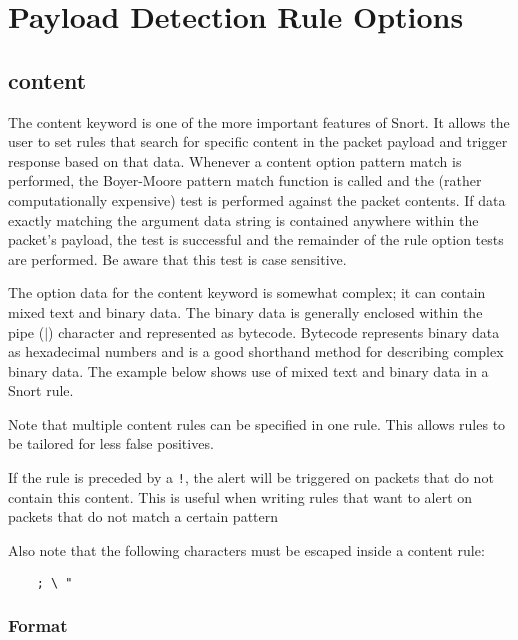 \documentclass[english]{report}
\newenvironment{note}{
\samepage
    \vspace{10pt}{\textsf{
        {\hspace{7pt}\Huge{$\triangle$\hspace{-12.5pt}{\Large{$^!$}}}}\hspace{5pt}
        {\Large{NOTE}}
    }
    }
   \begin{center}
    \par\vspace{-17pt}

    \begin{lrbox}{\savepar}
    \begin{minipage}[r]{6in}
}
{
    \end{minipage}
    \end{lrbox}
    \fbox{
        \usebox{
            \savepar
	}
    }
    \par\vskip10pt
    \end{center}
}
\newenvironment{note}{
        \begin{rawhtml}
        <p><table border="1"><tr><td><b>
        Note:&nbsp;&nbsp;</b>
        \end{rawhtml}
}{
        \begin{rawhtml}
        </b></td></tr></table></p>
        \end{rawhtml}
}
\begin{document}
\section{Payload Detection Rule Options}
\subsection{content}
\label{sub:content}

The content keyword is one of the more important features of Snort.  It allows
the user to set rules that search for specific content in the packet payload
and trigger response based on that data. Whenever a content option pattern
match is performed, the Boyer-Moore pattern match function is called and the
(rather computationally expensive) test is performed against the packet
contents. If data exactly matching the argument data string is contained
anywhere within the packet's payload, the test is successful and the remainder
of the rule option tests are performed. Be aware that this test is case
sensitive.

The option data for the content keyword is somewhat complex; it can contain
mixed text and binary data. The binary data is generally enclosed within the
pipe ($|$) character and represented as bytecode. Bytecode represents binary
data as hexadecimal numbers and is a good shorthand method for describing
complex binary data.  The example below shows use of mixed text and binary data
in a Snort rule. 

Note that multiple content rules can be specified in one rule. This allows
rules to be tailored for less false positives. 

If the rule is preceded by a \texttt{!}, the alert will be triggered on packets
that do not contain this content. This is useful when writing rules that want
to alert on packets that do not match a certain pattern

\begin{note}

Also note that the following characters must be escaped inside a content rule:

\begin{verbatim}
    ; \ "
\end{verbatim}
\end{note}

\subsubsection{Format}
\end{document}
